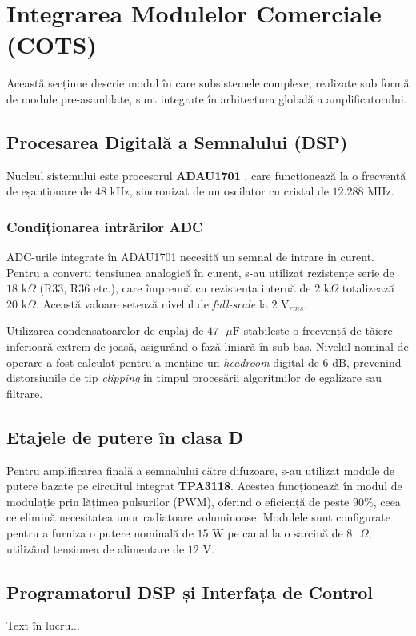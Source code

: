 \section{Integrarea Modulelor Comerciale (COTS)}
Această secțiune descrie modul în care subsistemele complexe, realizate sub formă de module pre-asamblate, sunt integrate în arhitectura globală a amplificatorului.

\subsection{Procesarea Digitală a Semnalului (DSP)}
Nucleul sistemului este procesorul \textbf{ADAU1701} \cite{adau1701}, care funcționează la o frecvență de eșantionare de $48\text{ kHz}$, sincronizat de un oscilator cu cristal de $12.288\text{ MHz}$.

\subsubsection{Condiționarea intrărilor ADC}
ADC-urile integrate în ADAU1701 necesită un semnal de intrare in curent. Pentru a converti tensiunea analogică în curent, s-au utilizat rezistențe serie de \textbf{$18\text{ k}\Omega$} (R33, R36 etc.), care împreună cu rezistența internă de $2\text{ k}\Omega$ totalizează $20\text{ k}\Omega$. Această valoare setează nivelul de \textit{full-scale} la $2\text{ V}_{rms}$.

Utilizarea condensatoarelor de cuplaj de \textbf{$47\text{ }\mu\text{F}$} stabilește o frecvență de tăiere inferioară extrem de joasă, asigurând o fază liniară în sub-bas. Nivelul nominal de operare a fost calculat pentru a menține un \textit{headroom} digital de $6\text{ dB}$, prevenind distorsiunile de tip \textit{clipping} în timpul procesării algoritmilor de egalizare sau filtrare.

\subsection{Etajele de putere în clasa D}
Pentru amplificarea finală a semnalului către difuzoare, s-au utilizat module de putere bazate pe circuitul integrat \textbf{TPA3118}. Acestea funcționează în modul de modulație prin lățimea pulsurilor (PWM), oferind o eficiență de peste $90\%$, ceea ce elimină necesitatea unor radiatoare voluminoase. Modulele sunt configurate pentru a furniza o putere nominală de $15\text{ W}$ pe canal la o sarcină de $8\text{ }\Omega$, utilizând tensiunea de alimentare de $12\text{ V}$.

\subsection{Programatorul DSP și Interfața de Control}
Text în lucru...
